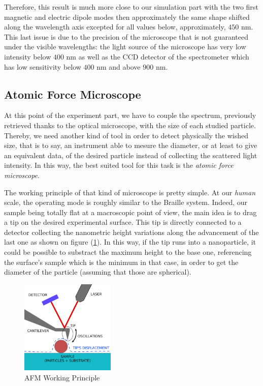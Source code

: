 \documentclass{article}
\numberwithin{equation}{section}
\begin{document}
Therefore, this result is much more close to our simulation part with the two first magnetic and electric dipole modes then approximately the same shape shifted along the wavelength axis excepted for all values below, approximately, $450$ nm. This last issue is due to the precision of the microscope that is not guaranteed under the visible wavelengths: the light source of the microscope has very low intensity below $400$ nm as well as the CCD detector of the spectrometer which has low sensitivity below $400$ nm and above $900$ nm.

\subsection{Atomic Force Microscope}

At this point of the experiment part, we have to couple the spectrum, previously retrieved thanks to the optical microscope, with the size of each studied particle. Thereby, we need another kind of tool in order to detect physically the wished size, that is to say, an instrument able to mesure the diameter, or at least to give an equivalent data, of the desired particle instead of collecting the scattered light intensity. In this way, the best suited tool for this task is the \textit{atomic force microscope}.

The working principle of that kind of microscope is pretty simple. At our \textit{human} scale, the operating mode is roughly similar to the Braille system. Indeed, our sample being totally flat at a macroscopic point of view, the main idea is to drag a tip on the desired experimental surface. This tip is directly connected to a detector collecting the nanometric height variations along the advancement of the last one as shown on figure (\ref{fig:afm_working_principle}). In this way, if the tip runs into a nanoparticle, it could be possible to substract the maximum height to the base one, referencing the surface's sample which is the minimum in that case, in order to get the diameter of the particle (assuming that those are spherical).
\begin{figure}[h!]
    \centering
    \includegraphics[width=0.4\textwidth, height=0.4\textwidth]{afm_working_principle.png}
    \caption{AFM Working Principle}
    \label{fig:afm_working_principle}
\end{figure}
\end{document}
